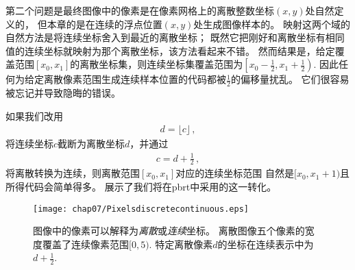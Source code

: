 第二个问题是最终图像中的像素是在像素网格上的离散整数坐标$(x,y)$处自然定义的，
但本章的是在连续的浮点位置$(x,y)$处生成图像样本的。
映射这两个域的自然方法是将连续坐标舍入到最近的离散坐标；
既然它把刚好和离散坐标有相同值的连续坐标就映射为那个离散坐标，该方法看起来不错。
然而结果是，给定覆盖范围$[x_0,x_1]$的离散坐标集，则连续坐标集覆盖范围为$\displaystyle\left[x_0-\frac{1}{2},x_1+\frac{1}{2}\right)$.
因此任何为给定离散像素范围生成连续样本位置的代码都被$\displaystyle\frac{1}{2}$的偏移量扰乱。
它们很容易被忘记并导致隐晦的错误。

如果我们改用
\begin{align*}
    d=\lfloor c\rfloor\, ,
\end{align*}
将连续坐标$c$截断为离散坐标$d$，并通过
\begin{align*}
    c=d+\frac{1}{2}\, ,
\end{align*}
将离散转换为连续，则离散范围$[x_0,x_1]$对应的连续坐标范围
自然是$[x_0,x_1+1)$且所得代码会简单得多\citep{HECKBERT1990246}。
展示了我们将在pbrt中采用的这一转化。
\begin{figure}[htbp]
    \centering\texttt{[image: chap07/Pixelsdiscretecontinuous.eps]}
    \caption{图像中的像素可以解释为\emph{离散}或\emph{连续}坐标。
    离散图像五个像素的宽度覆盖了连续像素范围$[0,5)$.
    特定离散像素$d$的坐标在连续表示中为$\displaystyle d+\frac{1}{2}$.}
    \label{fig:7.12}
\end{figure}